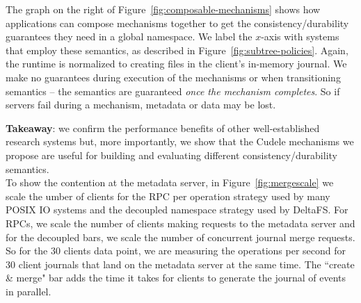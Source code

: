 
The graph on the right of Figure~\ref{fig:composable-mechanisms} shows how
applications can compose mechanisms together to get the consistency/durability
guarantees they need in a global namespace.  We label the \(x\)-axis with
systems that employ these semantics, as described in
Figure~\ref{fig:subtree-policies}.  Again, the runtime is normalized to
creating files in the client's in-memory journal.  We make no guarantees
during execution of the mechanisms or when transitioning semantics -- the
semantics are guaranteed {\it once the mechanism completes}. So if servers fail
during a mechanism, metadata or data may be lost.

\textbf{Takeaway}: we confirm the performance benefits of other
well-established research systems but, more importantly, we show that the
Cudele mechanisms we propose are useful for building and evaluating different
consistency/durability semantics.\\

To show the contention at the metadata server, in Figure~\ref{fig:mergescale}
we scale the umber of clients for the RPC per operation strategy used by many
POSIX IO systems and the decoupled namespace strategy used by DeltaFS. For
RPCs, we scale the number of clients making requests to the metadata server and
for the decoupled bars, we scale the number of concurrent journal merge
requests. So for the 30 clients data point, we are measuring the operations per
second for 30 client journals that land on the metadata server at the same
time. The ``create \& merge" bar adds the time it takes for clients to generate
the journal of events in parallel.


